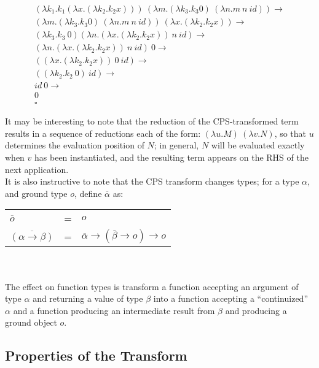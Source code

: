 \documentclass[a4paper,10pt]{article}
\begin{document}
\begin{eqnarray*}
 (\lambda k_1 . k_1 (\lambda x . (\lambda k_2 . k_2 x)))\ 
(\lambda m . (\lambda k_3 . k_3 0)\ (\lambda n . m\ n\ id)) \rightarrow \\
%
(\lambda m . (\lambda k_3 . k_3 0)\ (\lambda n . m\ n\ id))\ 
(\lambda x . (\lambda k_2 . k_2 x)) \rightarrow \\
%
(\lambda k_3 . k_3\ 0) (\lambda n . (\lambda x. (\lambda k_2. k_2 x))\ n\ id) \rightarrow\\
%
(\lambda n . (\lambda x. (\lambda k_2. k_2 x))\ n\ id)\ 0 \rightarrow\\
%
((\lambda x. (\lambda k_2. k_2 x))\ 0\ id) \rightarrow\\
%
((\lambda k_2. k_2\ 0)\ id) \rightarrow\\
%
id\ 0 \rightarrow\\
%
0\\
\square
\end{eqnarray*}

It may be interesting to note that the reduction of the CPS-transformed term results in a sequence
of reductions each of the form: $(\lambda u. M)\ (\lambda v. N)$, so that $u$ determines the evaluation
position of $N$; in general, $N$ will be evaluated exactly when $v$ has been instantiated, and the
resulting term appears on the RHS of the next application.\\

It is also instructive to note that the CPS transform changes types; for a type $\alpha$,
and ground type $o$, define $\overline{\alpha}$ as:\\

\begin{tabular}[t]{lll}
 $\overline{o}$ &=& $o$\\
$\overline{(\alpha \rightarrow \beta)}$ &=& $\overline{\alpha}
  \rightarrow (\overline{\beta} \rightarrow o) \rightarrow o$\\
\end{tabular}
\\
\\
The effect on function types is transform a function accepting an argument of type $\alpha$
and returning a value of type $\beta$ into a function accepting a ``continuized'' $\alpha$ and
a function producing an intermediate result from $\beta$ and producing a ground object $o$.

\subsection{Properties of the Transform}
\end{document}
